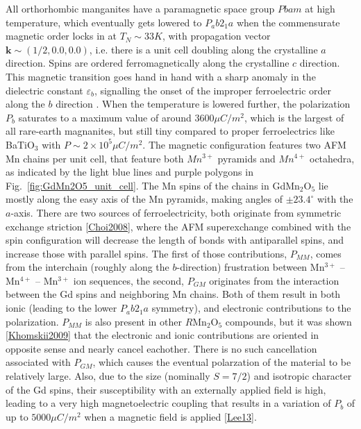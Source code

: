 All orthorhombic manganites have a paramagnetic space group $Pbam$ \cite{Alfonso97a} at high temperature, which eventually gets lowered to $P_ab2_1a$ when the commensurate magnetic order locks in at $T_{N} \sim 33K$, with propagation vector $\bm{k} \sim (1/2, 0.0, 0.0)$, i.e. there is a unit cell doubling along the crystalline $a$ direction. Spins are ordered ferromagnetically along the crystalline $c$ direction. This magnetic transition goes hand in hand with a sharp anomaly in the dielectric constant $\varepsilon_b$, signalling the onset of the improper ferroelectric order along the $b$ direction \cite{Lee13}.
When the temperature is lowered further, the polarization $P_b$ saturates to a maximum value of around $3600 \mu C/m^2$, which is the largest of all rare-earth magnanites, but still tiny compared to proper ferroelectrics like BaTiO$_3$ with $P \sim 2 \times 10^5 \mu C/m^2$.
The magnetic configuration features two AFM Mn chains per unit cell, that feature both $Mn^{3+}$ pyramids and $Mn^{4+}$ octahedra, as indicated by the light blue lines and purple polygons in Fig.~\ref{fig:GdMn2O5_unit_cell}. The Mn spins of the chains in GdMn$_2$O$_5$ lie mostly along the easy axis of the Mn pyramids, making angles of $\pm 23.4^\circ$ with the $a$-axis.
There are two sources of ferroelectricity, both originate from symmetric exchange striction \ref{Choi2008}, where the AFM superexchange combined with the spin configuration will decrease the length of bonds with antiparallel spins, and increase those with parallel spins. The first of those contributions, $P_{MM}$, comes from the interchain (roughly along the $b$-direction) frustration between Mn$^{3+}$ -- Mn$^{4+}$ -- Mn$^{3+}$ ion sequences, the second, $P_{GM}$ originates from the interaction between the Gd spins and neighboring Mn chains.
Both of them result in both ionic (leading to the lower $P_ab2_1a$ symmetry), and electronic contributions to the polarization.
$P_{MM}$ is also present in other $R$Mn$_2$O$_5$ compounds, but it was shown \ref{Khomskii2009} that the electronic and ionic contributions are oriented in opposite sense and nearly cancel eachother.
There is no such cancellation associated with $P_{GM}$, which causes the eventual polarzation of the material to be relatively large. Also, due to the size (nominally $S=7/2$) and isotropic character of the Gd spins, their susceptibility with an externally applied field is high, leading to a very high magnetoelectric coupling that results in a variation of $P_b$ of up to $5000 \mu C/m^2$ when a magnetic field is applied \ref{Lee13}. 

